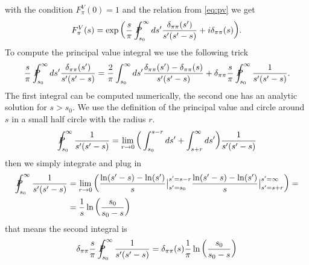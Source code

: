 \documentclass[a4paper]{article}
\begin{document}
with the condition $F_\pi^V(0) = 1$ and the relation from \ref{eq:pv} we get
\begin{align}
    F_\pi^V(s) =  \exp
    \bigg(
        \frac{s}{\pi}\PV_{s_0}^\infty ds' \frac{\delta_{\pi\pi}(s')}{s'(s'-s)}
        + i\delta_{\pi\pi}(s)
    \bigg).
\end{align}
To compute the principal value integral we use the following trick
\begin{align}
    \frac{s}{\pi}\PV_{s_0}^\infty ds' \frac{\delta_{\pi\pi}(s')}{s'(s'-s)} =
    \frac{2}{\pi} \int_{s_0}^\infty ds' \frac{\delta_{\pi\pi}(s')
    -\delta_{\pi\pi}(s)}{s'(s'-s)}+
    \delta_{\pi\pi}\frac{s}{\pi}\PV_{s_0}^\infty \frac{1}{s'(s'-s)}.
\end{align}
The first integral can be computed numerically, the second one has an analytic
solution for $s > s_0$. We use the definition of the principal value and circle
around $s$ in a small half circle with the radius $r$.
\begin{align}
    \PV_{s_0}^\infty \frac{1}{s'(s'-s)} = \lim_{\substack{r\rightarrow0}}
    \bigg(
    \int_{s_0}^{s-r}ds'  + \int_{s+r}^{\infty} ds'
    \bigg)\frac{1}{s'(s'-s)}
\end{align}
then we simply integrate and plug in
\begin{align}
    \PV_{s_0}^\infty \frac{1}{s'(s'-s)} &= \lim_{\substack{r\rightarrow 0}}
    \bigg(
    \frac{\ln(s'-s) - \ln(s')}{s}\big|_{s'= s_0}^{s'= s-r}
    \frac{\ln(s'-s)-\ln(s')}{s}\big|_{s'=s+r}^{s'=\infty}
    \bigg) =\\
    &=\frac{1}{s}\ln\left(\frac{s_0}{s_0-s}\right)
\end{align}
that means the second integral is
\begin{align}
    \delta_{\pi\pi}\frac{s}{\pi}\PV_{s_0}^\infty \frac{1}{s'(s'-s)}
    =\delta_{\pi\pi}(s)\frac{1}{\pi} \ln\left(\frac{s_0}{s_0 -s }\right)
\end{align}
\end{document}
